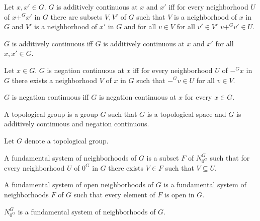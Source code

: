 \documentclass[11pt]{article}
\newcommand{\neigh}[2]{N^{#2}_{#1}}
\begin{document}
\begin{forthel}

\begin{definition}
Let $x,x' \in G$. $G$ is additively continuous at $x$ and $x'$ iff
for every neighborhood $U$ of $x +^{G} x'$ in $G$
there are subsets $V,V'$ of $G$ such that 
$V$ is a neighborhood of $x$ in $G$ and $V'$ is a neighborhood
of $x'$ in $G$ and for all $v \in V$ for all $v' \in V'$ 
$v +^{G} v' \in U$.
\end{definition}

\begin{definition}
$G$ is additively continuous iff $G$ is additively continuous at
$x$ and $x'$ for all $x,x' \in G$.
\end{definition}

\begin{definition}
Let $x \in G$. $G$ is negation continuous at $x$ iff
for every neighborhood $U$ of $-^{G} x$ in $G$
there exists a neighborhood $V$ of $x$ in $G$ such that 
$-^{G} v \in U$ for all $v \in V$.
\end{definition}

\begin{definition}
$G$ is negation continuous iff $G$ is negation continuous at $x$
for every $x \in G$.
\end{definition}

\begin{definition}[title = Topological group]
A topological group is a group $G$ such that $G$ is a topological space
and $G$ is additively continuous and negation continuous.
\end{definition}

Let $G$ denote a topological group.

\begin{definition}
A fundamental system of neighborhoods of $G$ is a subset $F$ of $\neigh{0^{G}}{G}$ such
that for every neighborhood $U$ of $0^{G}$ in $G$ there exists $V \in F$ such that
$V \subseteq U$.
\end{definition}

\begin{definition}
A fundamental system of open neighborhoods of $G$ is 
a fundamental system of neighborhoods $F$ of $G$ such
that every element of $F$ is open in $G$.
\end{definition}


\begin{proposition}
$\neigh{0^{G}}{G}$ is a fundamental system of neighborhoods of $G$.
\end{proposition}


\end{forthel}
\end{document}
